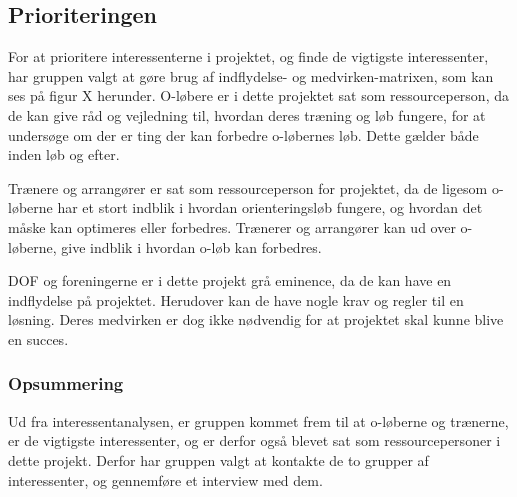 \subsection{Prioriteringen}
For at prioritere interessenterne i projektet, og finde de vigtigste interessenter, har gruppen valgt at gøre brug af indflydelse- og medvirken-matrixen, som kan ses på figur X herunder.  
O-løbere er i dette projektet sat som ressourceperson, da de kan give råd og vejledning til, hvordan deres træning og løb fungere, for at undersøge om der er ting der kan forbedre o-løbernes løb. Dette gælder både inden løb og efter.

Trænere og arrangører er sat som ressourceperson for projektet, da de ligesom o-løberne har et stort indblik i hvordan orienteringsløb fungere, og hvordan det måske kan optimeres eller forbedres. Trænerer og arrangører kan ud over o-løberne, give indblik i hvordan o-løb kan forbedres.  

DOF og foreningerne er i dette projekt grå eminence, da de kan have en indflydelse på projektet. Herudover kan de have nogle krav og regler til en løsning. Deres medvirken er dog ikke nødvendig for at projektet skal kunne blive en succes.   





\subsubsection{Opsummering}
Ud fra interessentanalysen, er gruppen kommet frem til at o-løberne og trænerne, er de vigtigste interessenter, og er derfor også blevet sat som ressourcepersoner i dette projekt. Derfor har gruppen valgt at kontakte de to grupper af interessenter, og gennemføre et interview med dem. 
